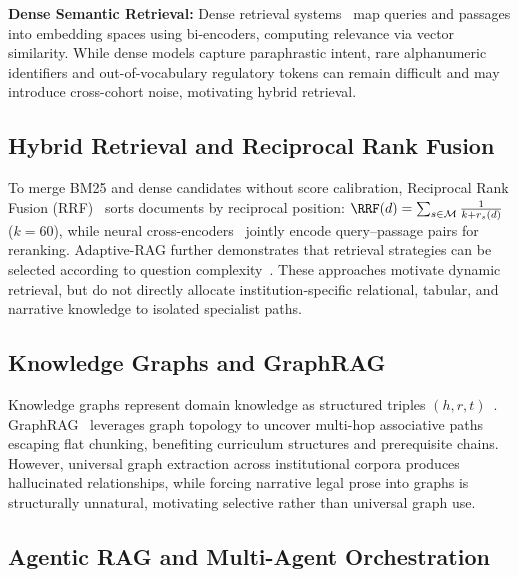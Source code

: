 \textbf{Dense Semantic Retrieval:} Dense retrieval systems~\cite{karpukhin2020dpr,lewis2020rag} map queries and passages into embedding spaces using bi-encoders, computing relevance via vector similarity. While dense models capture paraphrastic intent, rare alphanumeric identifiers and out-of-vocabulary regulatory tokens can remain difficult and may introduce cross-cohort noise, motivating hybrid retrieval.

\subsection{Hybrid Retrieval and Reciprocal Rank Fusion}
\label{sec:hybrid_rrf}

To merge BM25 and dense candidates without score calibration, Reciprocal Rank Fusion (RRF)~\cite{cormack2009rrf} sorts documents by reciprocal position: $\RRF(d) = \sum_{s \in \mathcal{M}} \frac{1}{k + r_s(d)}$ ($k = 60$), while neural cross-encoders~\cite{nogueira2019bert,xiao2023bge} jointly encode query--passage pairs for reranking. Adaptive-RAG further demonstrates that retrieval strategies can be selected according to question complexity~\cite{jeong2024adaptiverag}. These approaches motivate dynamic retrieval, but do not directly allocate institution-specific relational, tabular, and narrative knowledge to isolated specialist paths.

\subsection{Knowledge Graphs and GraphRAG}
\label{sec:kg_graphrag}

Knowledge graphs represent domain knowledge as structured triples $(h, r, t)$~\cite{pan2024unifying}. GraphRAG~\cite{edge2024graphrag} leverages graph topology to uncover multi-hop associative paths escaping flat chunking, benefiting curriculum structures and prerequisite chains. However, universal graph extraction across institutional corpora produces hallucinated relationships, while forcing narrative legal prose into graphs is structurally unnatural, motivating selective rather than universal graph use.

\subsection{Agentic RAG and Multi-Agent Orchestration}
\label{sec:agentic_multiagent}

